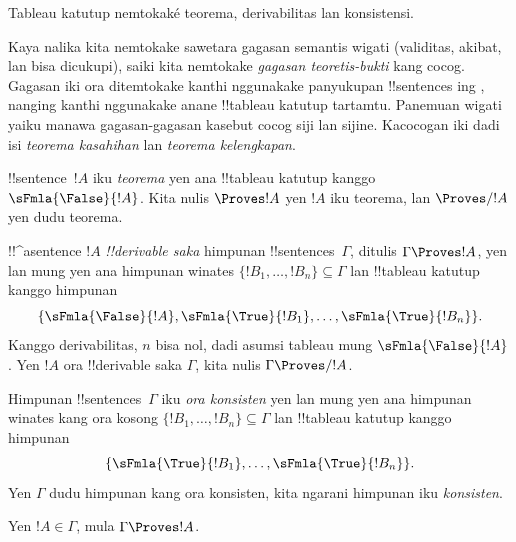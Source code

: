 \documentclass[../../../include/open-logic-section]{subfiles}
\begin{document}
      {}
      {}
      

\begin{editorial}
Tableau katutup nemtokaké teorema, derivabilitas lan konsistensi.
\end{editorial}

\begin{explain}
Kaya nalika kita nemtokake sawetara gagasan semantis wigati
(validitas, akibat, lan bisa dicukupi), saiki kita nemtokake
\emph{gagasan teoretis-bukti} kang cocog. Gagasan iki ora ditemtokake
kanthi nggunakake panyukupan !!{sentence}s ing , nanging
kanthi nggunakake anane !!{tableau} katutup tartamtu. Panemuan wigati
yaiku manawa gagasan-gagasan kasebut cocog siji lan sijine. Kacocogan
iki dadi isi \emph{teorema kasahihan} lan
\emph{teorema kelengkapan}.
\end{explain}


\begin{defn}[Teorema]
!!{sentence}~$!A$ iku \emph{teorema} yen ana !!{tableau} katutup
kanggo~$\sFmla{\False}{!A}$. Kita nulis $\Proves !A$ yen $!A$
iku teorema, lan $\Proves/ !A$ yen dudu teorema.
\end{defn}

\begin{defn}[!!^{derivability}]
!!^a{sentence} $!A$ \emph{!!{derivable} saka} himpunan
!!{sentence}s~$\Gamma$, ditulis $\Gamma \Proves !A$, yen lan mung yen
ana himpunan winates $\{!B_1, \dots, !B_n\} \subseteq \Gamma$
lan !!{tableau} katutup kanggo himpunan
\[
\{
  \sFmla{\False}{!A},
  \sFmla{\True}{!B_1}, \dots,
  \sFmla{\True}{!B_n}
  \}.
\]
Kanggo derivabilitas, $n$ bisa nol, dadi asumsi tableau mung $\sFmla{\False}{!A}$.
Yen $!A$ ora !!{derivable} saka $\Gamma$, kita nulis $\Gamma
\Proves/ !A$.
\end{defn}

\begin{defn}[Konsistensi]
Himpunan !!{sentence}s~$\Gamma$ iku \emph{ora konsisten} yen lan mung
yen ana himpunan winates kang ora kosong $\{!B_1, \dots, !B_n\}
\subseteq \Gamma$ lan !!{tableau} katutup kanggo himpunan
\[
\{
  \sFmla{\True}{!B_1}, \dots,
  \sFmla{\True}{!B_n}  
  \}.
\]
Yen $\Gamma$ dudu himpunan kang ora konsisten, kita ngarani himpunan iku
\emph{konsisten}.
\end{defn}

\begin{prop}[Refleksivitas]
Yen $!A \in \Gamma$, mula $\Gamma \Proves !A$.
\end{prop}
\end{document}
